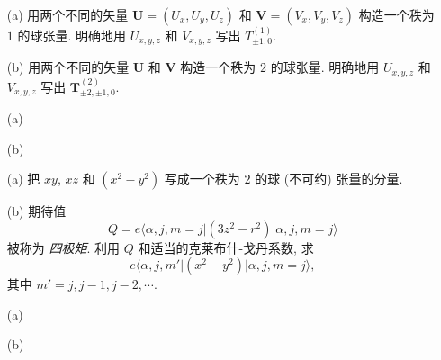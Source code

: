 \documentclass{assignment}
\begin{document}
\begin{prob}[课本习题 3.30]
    \begin{itemize}
        \item[(a)] 用两个不同的矢量 $\bm{U}=(U_x,U_y,U_z)$ 和 $\bm{V}=(V_x,V_y,V_z)$ 构造一个秩为 $1$ 的球张量. 明确地用 $U_{x,y,z}$ 和 $V_{x,y,z}$ 写出 $T_{\pm 1,0}^{(1)}$.
        \item[(b)] 用两个不同的矢量 $\bm{U}$ 和 $\bm{V}$ 构造一个秩为 $2$ 的球张量. 明确地用 $U_{x,y,z}$ 和 $V_{x,y,z}$ 写出 $\bm{T}_{\pm 2,\pm 1,0}^{(2)}$.
    \end{itemize}
\end{prob}
\begin{sol}
    \begin{itemize}
        \item[(a)] 
        \item[(b)] 
    \end{itemize}
\end{sol}

\begin{prob}[课本习题 3.32]
    \begin{itemize}
        \item[(a)] 把 $xy$, $xz$ 和 $(x^2-y^2)$ 写成一个秩为 $2$ 的球 (不可约) 张量的分量.
        \item[(b)] 期待值
        \[
            Q=e\langle\alpha,j,m=j\rvert(3z^2-r^2)\lvert\alpha,j,m=j\rangle
        \]
        被称为 \textit{四极矩}. 利用 $Q$ 和适当的克莱布什-戈丹系数, 求
        \[
            e\langle\alpha,j,m'\rvert(x^2-y^2)\lvert\alpha,j,m=j\rangle,
        \]
        其中 $m'=j,j-1,j-2,\cdots$.
    \end{itemize}
\end{prob}
\begin{sol}
    \begin{itemize}
        \item[(a)] 
        \item[(b)] 
    \end{itemize}
\end{sol}
\end{document}
